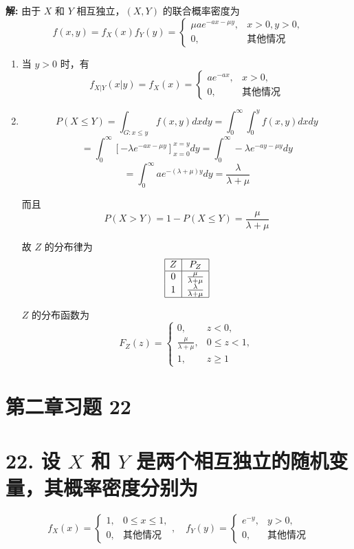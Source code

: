 \documentclass[twoside]{article}
\begin{document}
\begin{ans}{20}{20}
    \textbf{解:} 由于 $X$ 和 $Y$ 相互独立，$(X,Y)$ 的联合概率密度为 
\[
f(x,y) = f_X(x)f_Y(y) =
\begin{cases} 
\mu ae^{-ax-\mu y}, & x > 0, y > 0, \\ 
0, & \text{其他情况} 
\end{cases}
\]

\begin{enumerate}
    \item 当 $y > 0$ 时，有
    \[
    f_{X|Y}(x|y) = f_X(x) = 
    \begin{cases} 
    ae^{-ax}, & x > 0, \\ 
    0, & \text{其他情况} 
    \end{cases}
    \]
    
    \item 
    \[
    P(X \leq Y) = \int_{G: x \leq y} f(x,y)dxdy = \int_{0}^{\infty} \int_{0}^{y} f(x,y)dxdy 
    \]
    \[
    = \int_{0}^{\infty} \left[-\lambda e^{-ax-\mu y}\right]_{x=0}^{x=y} dy = \int_{0}^{\infty} -\lambda e^{-ay-\mu y} dy
    \]
    \[
    = \int_{0}^{\infty} ae^{-(\lambda + \mu)y} dy = \frac{\lambda}{\lambda + \mu}
    \]

    而且 
    \[
    P(X > Y) = 1 - P(X \leq Y) = \frac{\mu}{\lambda + \mu}
    \]

    故 $Z$ 的分布律为
    \[
    \begin{array}{|c|c|}
    \hline
    Z & P_Z \\
    \hline
    0 & \frac{\mu}{\lambda + \mu} \\
    1 & \frac{\lambda}{\lambda + \mu} \\
    \hline
    \end{array}
    \]

    $Z$ 的分布函数为
    \[
    F_Z(z) = 
    \begin{cases} 
    0, & z < 0, \\ 
    \frac{\mu}{\lambda + \mu}, & 0 \leq z < 1, \\ 
    1, & z \geq 1 
    \end{cases}
    \]
\end{enumerate}

\end{ans}

\section{第二章习题 22}

\section*{22. 设 $X$ 和 $Y$ 是两个相互独立的随机变量，其概率密度分别为}
\[
f_X(x) = 
\begin{cases} 
1, & 0 \leq x \leq 1, \\ 
0, & \text{其他情况} 
\end{cases}, \quad 
f_Y(y) = 
\begin{cases} 
e^{-y}, & y > 0, \\ 
0, & \text{其他情况} 
\end{cases}
\]
\end{document}

